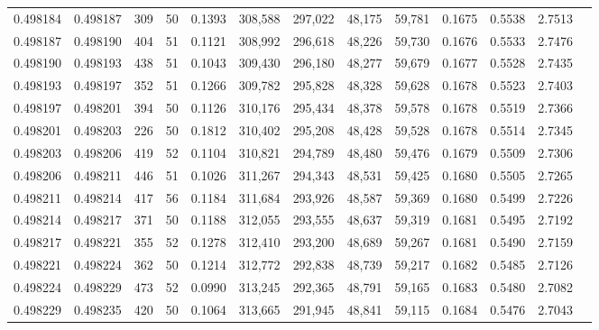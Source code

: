\begin{tabular}{rrrrrrrrrrrrr}
0.498184 & 0.498187 & 309 &  50 &                                     0.1393 & 308,588 & 297,022 &  48,175 &  59,781 & 0.1675 & 0.5538 & 2.7513 \\
0.498187 & 0.498190 & 404 &  51 &                                     0.1121 & 308,992 & 296,618 &  48,226 &  59,730 & 0.1676 & 0.5533 & 2.7476 \\
0.498190 & 0.498193 & 438 &  51 &                                     0.1043 & 309,430 & 296,180 &  48,277 &  59,679 & 0.1677 & 0.5528 & 2.7435 \\
0.498193 & 0.498197 & 352 &  51 &                                     0.1266 & 309,782 & 295,828 &  48,328 &  59,628 & 0.1678 & 0.5523 & 2.7403 \\
0.498197 & 0.498201 & 394 &  50 &                                     0.1126 & 310,176 & 295,434 &  48,378 &  59,578 & 0.1678 & 0.5519 & 2.7366 \\
0.498201 & 0.498203 & 226 &  50 &                                     0.1812 & 310,402 & 295,208 &  48,428 &  59,528 & 0.1678 & 0.5514 & 2.7345 \\
0.498203 & 0.498206 & 419 &  52 &                                     0.1104 & 310,821 & 294,789 &  48,480 &  59,476 & 0.1679 & 0.5509 & 2.7306 \\
0.498206 & 0.498211 & 446 &  51 &                                     0.1026 & 311,267 & 294,343 &  48,531 &  59,425 & 0.1680 & 0.5505 & 2.7265 \\
0.498211 & 0.498214 & 417 &  56 &                                     0.1184 & 311,684 & 293,926 &  48,587 &  59,369 & 0.1680 & 0.5499 & 2.7226 \\
0.498214 & 0.498217 & 371 &  50 &                                     0.1188 & 312,055 & 293,555 &  48,637 &  59,319 & 0.1681 & 0.5495 & 2.7192 \\
0.498217 & 0.498221 & 355 &  52 &                                     0.1278 & 312,410 & 293,200 &  48,689 &  59,267 & 0.1681 & 0.5490 & 2.7159 \\
0.498221 & 0.498224 & 362 &  50 &                                     0.1214 & 312,772 & 292,838 &  48,739 &  59,217 & 0.1682 & 0.5485 & 2.7126 \\
0.498224 & 0.498229 & 473 &  52 &                                     0.0990 & 313,245 & 292,365 &  48,791 &  59,165 & 0.1683 & 0.5480 & 2.7082 \\
0.498229 & 0.498235 & 420 &  50 &                                     0.1064 & 313,665 & 291,945 &  48,841 &  59,115 & 0.1684 & 0.5476 & 2.7043 \\

\end{tabular}
